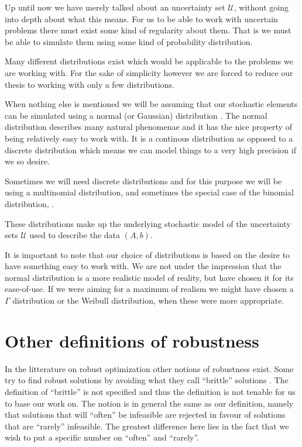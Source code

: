 Up until now we have merely talked about an uncertainty set
$\mathcal{U}$, without going into depth about what this means. For us
to be able to work with uncertain problems there must exist some kind
of regularity about them. That is we must be able to simulate them
using some kind of probability distribution.

Many different distributions exist which would be applicable to the
problems we are working with. For the sake of simplicity however we
are forced to reduce our thesis to working with only a few distributions.

When nothing else is mentioned we will be assuming that our stochastic
elements can be simulated using a normal (or Gaussian) distribution
\cite{statistik}. The normal distribution describes many natural
phenomenae and it has the nice property of being relatively easy to
work with. It is a continous distribution as opposed to a discrete
distribution which means we can model things to a very high precision
if we so desire.

Sometimes we will need discrete distributions and for this purpose we
will be using a multinomial distribution, and sometimes the special
case of the binomial distribution, \cite{sandsynlighed}.  

These distributions make up the underlying stochastic model of the
uncertainty sets $\mathcal{U}$ used to describe the data $(A,b)$.

It is important to note that our choice of distributions is based on
the desire to have something easy to work with. We are not under the
impression that the normal distribution is a more realistic model of
reality, but have chosen it for its ease-of-use. If we were aiming for
a maximum of realism we might have chosen a $\Gamma$ distribution or
the Weibull distribution, when these were more appropriate.

\section{Other definitions of robustness}

In the litterature on robust optimization other notions of robustness
exist. Some try to find robust solutions by avoiding what they call
``brittle'' solutions \cite{tsutsui}.  The definition of ``brittle''
is not specified and thus the definition is not tenable for us to base
our work on.  The notion is in general the same as our definition,
namely that solutions that will ``often'' be infeasible are rejected
in favour of solutions that are ``rarely'' infeasible. The greatest
difference here lies in the fact that we wish to put a specific number
on ``often'' and ``rarely''.